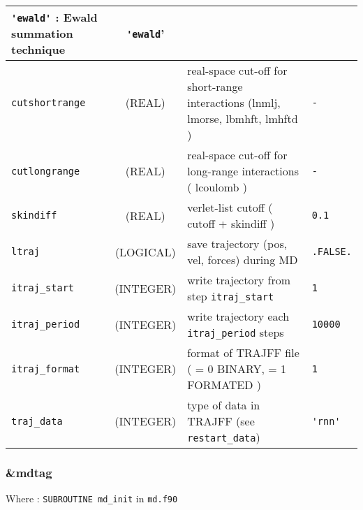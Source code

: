 \documentclass[a4paper]{article}
\begin{document}
\begin{longtable}{l|c|m{8cm}|m{2cm}}
					\verb?'ewald'? : Ewald summation technique \newline                                 &  \verb?'ewald?'      \tabularnewline
\hline
\rule[-0.75cm]{0cm}{1.5cm}
\verb?cutshortrange?    & (REAL)      &  real-space cut-off for short-range interactions  (lnmlj, lmorse, lbmhft, lmhftd )  & \verb?-?\\
\hline
\rule[-0.75cm]{0cm}{1.5cm}
\verb?cutlongrange?    & (REAL)       &  real-space cut-off for long-range interactions ( lcoulomb )                        & \verb?-?\\
\hline
\rule[-0.75cm]{0cm}{1.5cm}
\verb?skindiff?  & (REAL)             &  verlet-list cutoff ( cutoff + skindiff )                                           & \verb?0.1?\\
\hline
\rule[-0.75cm]{0cm}{1.5cm}
\verb?ltraj?     & (LOGICAL)          &  save trajectory (pos, vel, forces) during MD                                       & \verb?.FALSE.? \\
\hline
\rule[-0.75cm]{0cm}{1.5cm}
\verb?itraj_start?   & (INTEGER)      &  write trajectory from step \verb?itraj_start?                                      & \verb?1? \\
\hline
\rule[-0.75cm]{0cm}{1.5cm}
\verb?itraj_period?  & (INTEGER)      &  write trajectory each \verb?itraj_period? steps                                    & \verb?10000? \\
\hline
\rule[-0.75cm]{0cm}{1.5cm}
\verb?itraj_format?  & (INTEGER)      &  format of TRAJFF file ( = 0 BINARY, = 1 FORMATED )                               & \verb?1? \\
\hline
\rule[-0.75cm]{0cm}{1.5cm}
\verb?traj_data?  & (INTEGER)         &  type of data in TRAJFF (see \verb?restart_data?)                                   & \verb?'rnn'? \\
\hline
\end{longtable}

\subsubsection{\&mdtag}

Where : \verb?SUBROUTINE md_init? in \verb?md.f90?
\newline
\end{document}
